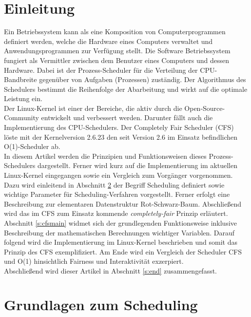 \documentclass[ngerman]{seminarvorlage}
\begin{document}
\section{Einleitung}
Ein Betriebssystem kann als eine Komposition von Computerprogrammen definiert werden, welche die Hardware eines Computers verwaltet und Anwendungsprogrammen zur Verfügung stellt. Die Software Betriebssystem fungiert als Vermittler zwischen dem Benutzer eines Computers und dessen Hardware. Dabei ist der Prozess-Scheduler  für die Verteilung der CPU-Bandbreite gegenüber von Aufgaben (Prozessen) zuständig. Der Algorithmus des Schedulers bestimmt die Reihenfolge der Abarbeitung und wirkt auf die optimale Leistung ein.\\
Der Linux-Kernel ist einer der Bereiche, die aktiv durch die Open-Source-Community entwickelt und verbessert werden. Darunter fällt auch die Implementierung des CPU-Schedulers. Der Completely Fair Scheduler (CFS) löste mit der Kernelversion 2.6.23 den seit Version 2.6 im Einsatz befindlichen O(1)-Scheduler ab.\\
In diesem Artikel werden die Prinzipien und Funktionsweisen dieses Prozess-Schedulers dargestellt. Ferner wird kurz auf die Implementierung im aktuellen Linux-Kernel eingegangen sowie ein Vergleich zum Vorgänger vorgenommen.\\
Dazu wird einleitend in Abschnitt \ref{s:basics} der Begriff Scheduling definiert sowie wichtige Parameter für Scheduling-Verfahren vorgestellt. Ferner erfolgt eine Beschreibung zur elementaren Datenstruktur Rot-Schwarz-Baum. Abschließend wird das im CFS zum Einsatz kommende \textit{com\-ple\-te\-ly-fair} Prinzip erläutert.\\
Abschnitt \ref{s:cfsmain} widmet sich der grundlegenden Funktionsweise inklusive Beschreibung der mathematischen Berechnungen wichtiger Variablen. Darauf folgend wird die Implementierung im Linux-Kernel beschrieben und somit das Prinzip des CFS exemplifiziert. Am Ende wird ein Vergleich der Scheduler CFS und O(1) hinsichtlich Fairness und Interaktivität exzerpiert. \\
Abschließend wird dieser Artikel in Abschnitt \ref{s:end} zusammengefasst.

\section{Grundlagen zum Scheduling}\label{s:basics}
\end{document}
